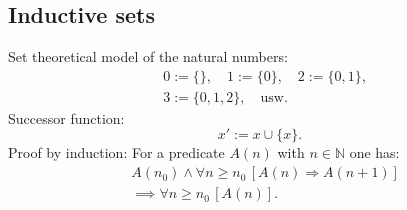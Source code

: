 \subsection{Inductive sets}
Set theoretical model of the natural numbers:
\begin{equation}
\begin{split}
& 0:=\{\},\quad 1:=\{0\},\quad 2:=\{0,1\},\\
& 3:=\{0,1,2\},\quad \text{usw.}
\end{split}
\end{equation}
Successor function:
\begin{equation}
x' := x\cup\{x\}.
\end{equation}
Proof by induction: For a predicate $A(n)$ with $n\in\mathbb N$
one has:
\begin{equation}
\begin{split}
& A(n_0)\land \forall n\ge n_0\,[A(n)\Rightarrow A(n+1)]\\
& \implies \forall n\ge n_0\,[A(n)].
\end{split}
\end{equation}

